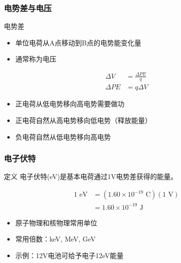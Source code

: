 \documentclass{beamer}
\begin{document}
\begin{frame}
    \frametitle{电势差与电压}
    
    \begin{block}{电势差}
        \begin{itemize}
            \item 单位电荷从A点移动到B点的电势能变化量
            \item 通常称为电压
        \end{itemize}
    \end{block}
    
    \begin{align}
        \Delta V &= \frac{\Delta PE}{q} \\
        \Delta PE &= q \Delta V
    \end{align}

    \begin{itemize}
        \item 正电荷从低电势移向高电势需要做功
        \item 正电荷自然从高电势移向低电势（释放能量）
        \item 负电荷自然从低电势移向高电势
    \end{itemize}
\end{frame}

\begin{frame}
    \frametitle{电子伏特}
    
    \begin{block}{定义}
        电子伏特(eV)是基本电荷通过1V电势差获得的能量。
    \end{block}
    
    \begin{align}
        1 \text{ eV} &= (1.60 \times 10^{-19} \text{ C})(1 \text{ V}) \\
        &= 1.60 \times 10^{-19} \text{ J}
    \end{align}
    
    \begin{itemize}
        \item 原子物理和核物理常用单位
        \item 常用倍数：keV, MeV, GeV
        \item 示例：12V电池可给予电子12eV能量
    \end{itemize}
\end{frame}
\end{document}
